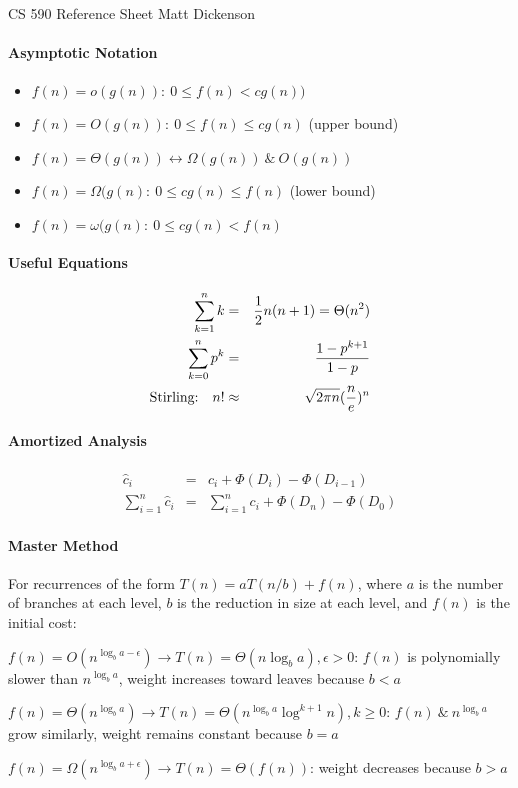\documentclass[10pt,letterpaper]{article}
\begin{document}
\large CS 590 Reference Sheet \hfill Matt Dickenson
\headsep 10pt

\paragraph{Asymptotic Notation}
\begin{itemize}
\item $f(n)=o(g(n)):~ 0 \leq f(n) < cg(n))$
\item $f(n)=O(g(n)):~0 \leq f(n) \leq cg(n)$ (upper bound) 
\item $f(n)=\Theta(g(n)) \leftrightarrow \Omega(g(n))~\&~O(g(n)) $
\item $f(n)=\Omega(g(n):~0 \leq cg(n) \leq f(n)$ (lower bound) 
\item $f(n)=\omega(g(n):~0 \leq cg(n) < f(n)$ 
\end{itemize}

\paragraph{Useful Equations}
\begin{eqnarray*}
\sum_{k=1}^n k &=& \frac{1}{2}n(n+1) = \Theta(n^2) \\
\sum_{k=0}^n p^k &=& {1-p^{k+1} \over 1 - p} \\ 
\text{Stirling:}~~~n! &\approx& \sqrt{2\pi n} ({ n \over e})^n
\end{eqnarray*}

\paragraph{Amortized Analysis}
\begin{eqnarray*}
\hat{c}_i &=& c_i + \Phi(D_i) - \Phi(D_{i-1}) \\
\sum_{i=1}^n \hat{c}_i &=& \sum_{i=1}^n c_i + \Phi(D_n)-\Phi(D_0)
\end{eqnarray*}

\paragraph{Master Method}
For recurrences of the form $T(n)=a T(n/b) + f(n)$, where $a$ is the number of branches at each level, $b$ is the reduction in size at each level, and $f(n)$ is the initial cost:

\begin{list}{\textbf{Case} :~}{}
\item $f(n) = O(n^{\log_b a - \epsilon}) \rightarrow T(n)=\Theta(n \log_b a), \epsilon>0$: $f(n)$ is polynomially slower than $n^{\log_b a}$, weight increases toward leaves because $b<a$
\item $f(n)=\Theta(n^{\log_b a}) \rightarrow T(n)=\Theta(n^{\log_b a} \log^{k+1} n), k\geq 0$: $f(n)~\&~n^{\log_b a}$ grow similarly, weight remains constant because $b=a$
\item $f(n)=\Omega(n^{\log_b a + \epsilon}) \rightarrow T(n)=\Theta(f(n))$: weight decreases because $b>a$
\end{list}
\end{document}
